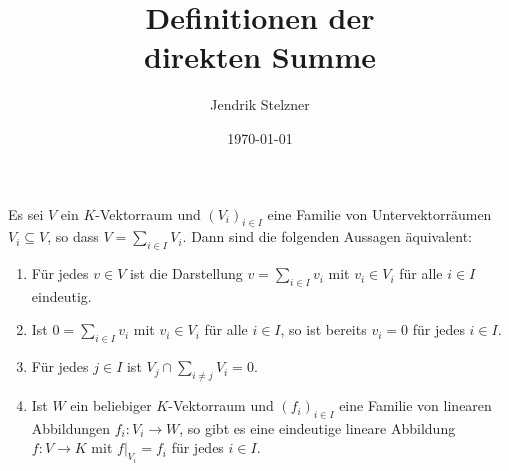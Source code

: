 \documentclass[a4paper,10pt]{scrartcl}
\title{Definitionen der \\ direkten Summe}
\author{Jendrik Stelzner}
\date{\today}
\begin{document}
\maketitle


\begin{abstract}
\end{abstract}





\begin{proposition}\label{prop: characterization of the inner direct sum}
  Es sei $V$ ein $K$-Vektorraum und $(V_i)_{i \in I}$ eine Familie von Untervektorräumen $V_i \subseteq V$, so dass $V = \sum_{i \in I} V_i$.
  Dann sind die folgenden Aussagen äquivalent:
  \begin{enumerate}
    \item\label{enum: unique sum representation}
      Für jedes $v \in V$ ist die Darstellung $v = \sum_{i \in I} v_i$ mit $v_i \in V_i$ für alle $i \in I$ eindeutig.
    \item\label{enum: unique sum representation of zero}
      Ist $0 = \sum_{i \in I} v_i$ mit $v_i \in V_i$ für alle $i \in I$, so ist bereits $v_i = 0$ für jedes $i \in I$.
    \item\label{enum: intersections are zero}
      Für jedes $j \in I$ ist $V_j \cap \sum_{i \neq j} V_i = 0$.
    \item\label{enum: universal property}
      Ist $W$ ein beliebiger $K$-Vektorraum und $(f_i)_{i \in I}$ eine Familie von linearen Abbildungen \mbox{$f_i \colon V_i \to W$}, so gibt es eine eindeutige lineare Abbildung $f \colon V \to K$ mit $f|_{V_i} = f_i$ für jedes $i \in I$.
  \end{enumerate}
\end{proposition}
\end{document}
